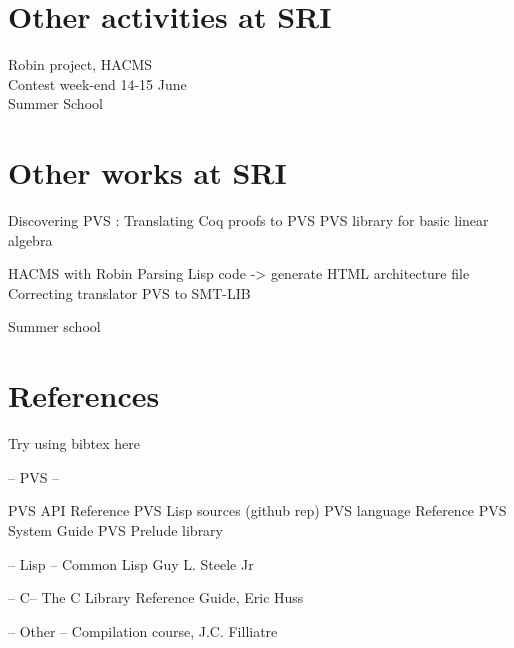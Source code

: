 \documentclass[12pt,a4paper,titlepage]{article}
\begin{document}
\section{Other activities at SRI}

Robin project, HACMS \\
Contest week-end 14-15 June \\
Summer School \\






\section{Other works at SRI}
Discovering PVS :
Translating Coq proofs to PVS
PVS library for basic linear algebra


HACMS with Robin
Parsing Lisp code -> generate HTML architecture file
Correcting translator PVS to SMT-LIB

Summer school




\section{References}
Try using bibtex here

-- PVS --

PVS API Reference
PVS Lisp sources (github rep)
PVS language Reference
PVS System Guide
PVS Prelude library

-- Lisp --
Common Lisp Guy L. Steele Jr

-- C-- 
The C Library Reference Guide, Eric Huss

-- Other --
Compilation course, J.C. Filliatre




\end{document}
